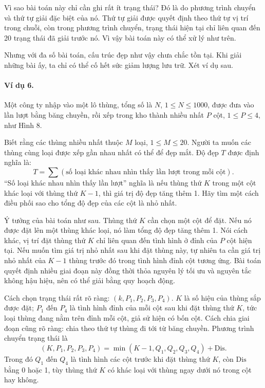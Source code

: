 \documentclass[11pt]{article}
\begin{document}
Vì sao bài toán này chỉ cần ghi rất ít trạng thái? Đó là do phương trình
chuyển và thứ tự giải đặc biệt của nó. Thứ tự giải được quyết định theo thứ
tự vị trí trong chuỗi, còn trong phương trình chuyển, trạng thái hiện tại chỉ
liên quan đến 20 trạng thái đã giải trước nó. Vì vậy bài toán này có thể xử
lý như trên.

Nhưng với đa số bài toán, cấu trúc đẹp như vậy chưa chắc tồn tại. Khi giải
những bài ấy, ta chỉ có thể cố hết sức giảm lượng lưu trữ. Xét ví dụ sau.

\paragraph{Ví dụ 6.}
Một công ty nhập vào một lô thùng, tổng số là \(N\), \(1\le N\le 1000\), được
đưa vào lần lượt bằng băng chuyền, rồi xếp trong kho thành nhiều nhất \(P\)
cột, \(1\le P\le 4\), như Hình 8.

Biết rằng các thùng nhiều nhất thuộc \(M\) loại, \(1\le M\le 20\). Người ta
muốn các thùng cùng loại được xếp gần nhau nhất có thể để đẹp mắt. Độ đẹp
\(T\) được định nghĩa là:
\[
  T=\sum(\text{số loại khác nhau nhìn thấy lần lượt trong mỗi cột}).
\]
``Số loại khác nhau nhìn thấy lần lượt'' nghĩa là nếu thùng thứ \(K\) trong
một cột khác loại với thùng thứ \(K-1\), thì giá trị độ đẹp tăng thêm 1. Hãy
tìm một cách điều phối sao cho tổng độ đẹp của các cột là nhỏ nhất.

Ý tưởng của bài toán như sau. Thùng thứ \(K\) cần chọn một cột để đặt. Nếu nó
được đặt lên một thùng khác loại, nó làm tổng độ đẹp tăng thêm 1. Nói cách
khác, vị trí đặt thùng thứ \(K\) chỉ liên quan đến tình hình ở đỉnh của \(P\)
cột hiện tại. Nếu muốn tìm giá trị nhỏ nhất sau khi đặt thùng này, tự nhiên
ta cần giá trị nhỏ nhất của \(K-1\) thùng trước đó trong tình hình đỉnh cột
tương ứng. Bài toán quyết định nhiều giai đoạn này đồng thời thỏa nguyên lý
tối ưu và nguyên tắc không hậu hiệu, nên có thể giải bằng quy hoạch động.

Cách chọn trạng thái rất rõ ràng: \((k,P_1,P_2,P_3,P_4)\). \(K\) là số hiệu
của thùng sắp được đặt; \(P_1\) đến \(P_4\) là tình hình đỉnh của mỗi cột sau
khi đặt thùng thứ \(K\), tức loại thùng đang nằm trên đỉnh mỗi cột, giả sử
hiện có bốn cột. Cách chia giai đoạn cũng rõ ràng: chia theo thứ tự thùng đi
tới từ băng chuyền. Phương trình chuyển trạng thái là
\[
  (K,P_1,P_2,P_3,P_4)
  = \min (K-1,Q_1,Q_2,Q_3,Q_4)+\mathrm{Dis}.
\]
Trong đó \(Q_1\) đến \(Q_4\) là tình hình các cột trước khi đặt thùng thứ
\(K\), còn \(\mathrm{Dis}\) bằng 0 hoặc 1, tùy thùng thứ \(K\) có khác loại
với thùng ngay dưới nó trong cột hay không.
\end{document}
